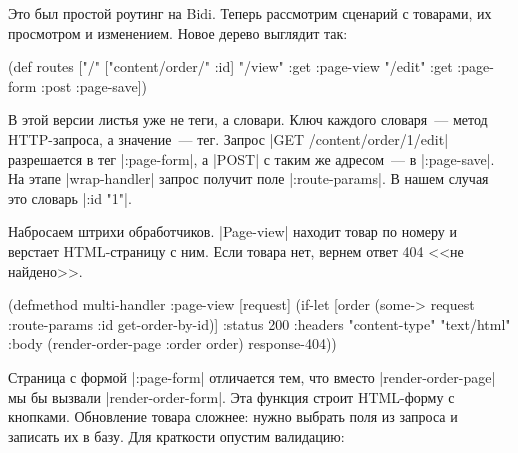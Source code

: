 Это был простой роутинг на Bidi. Теперь рассмотрим сценарий с товарами, их
просмотром и изменением. Новое дерево выглядит так:

\begin{english}
  \begin{clojure}
(def routes
  ["/" {["content/order/" :id]
        {"/view" {:get  :page-view}
         "/edit" {:get  :page-form
                  :post :page-save}}}])
  \end{clojure}
\end{english}

В этой версии листья уже не теги, а словари. Ключ каждого словаря~--- метод
HTTP-запроса, а значение~--- тег. Запрос \spverb|GET /content/order/1/edit|
разрешается в тег \spverb|:page-form|, а \spverb|POST| с таким же адресом~--- в \spverb|:page-save|.
На этапе \spverb|wrap-handler| запрос получит поле \spverb|:route-params|.
В нашем случая это словарь \spverb|{:id "1"}|.

Набросаем штрихи обработчиков. \spverb|Page-view| находит товар по номеру и
верстает HTML-страницу с ним. Если товара нет, вернем ответ 404 <<не найдено>>.

\begin{english}
  \begin{clojure}
(defmethod multi-handler :page-view
  [request]
  (if-let [order (some-> request :route-params :id get-order-by-id)]
    {:status 200
     :headers {"content-type" "text/html"}
     :body (render-order-page {:order order})}
    response-404))
  \end{clojure}
\end{english}

Страница с формой \spverb|:page-form| отличается тем, что вместо
\spverb|render-order-page| мы бы вызвали \spverb|render-order-form|. Эта функция
строит HTML-форму с кнопками. Обновление товара сложнее: нужно выбрать поля из
запроса и записать их в базу. Для краткости опустим валидацию:

\begin{english}
\end{english}

